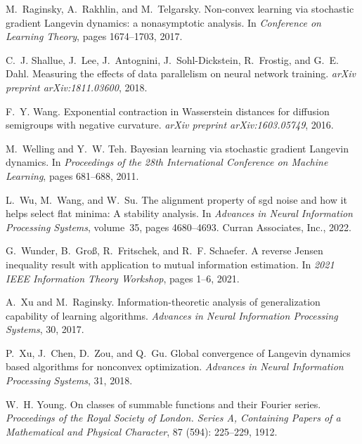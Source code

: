 \documentclass{article}
\begin{document}
\begin{thebibliography}{47}
M.~Raginsky, A.~Rakhlin, and M.~Telgarsky.
\newblock Non-convex learning via stochastic gradient {L}angevin dynamics: a nonasymptotic analysis.
\newblock In \emph{Conference on Learning Theory}, pages 1674--1703, 2017.

C.~J. Shallue, J.~Lee, J.~Antognini, J.~Sohl-Dickstein, R.~Frostig, and G.~E. Dahl.
\newblock Measuring the effects of data parallelism on neural network training.
\newblock \emph{arXiv preprint arXiv:1811.03600}, 2018.

F.~Y. Wang.
\newblock Exponential contraction in {W}asserstein distances for diffusion semigroups with negative curvature.
\newblock \emph{arXiv preprint arXiv:1603.05749}, 2016.

M.~Welling and Y.~W. Teh.
\newblock Bayesian learning via stochastic gradient {L}angevin dynamics.
\newblock In \emph{Proceedings of the 28th International Conference on Machine Learning}, pages 681--688, 2011.

L.~Wu, M.~Wang, and W.~Su.
\newblock The alignment property of sgd noise and how it helps select flat minima: A stability analysis.
\newblock In \emph{Advances in Neural Information Processing Systems}, volume~35, pages 4680--4693. Curran Associates, Inc., 2022.

G.~Wunder, B.~Gro{\ss}, R.~Fritschek, and R.~F. Schaefer.
\newblock A reverse {J}ensen inequality result with application to mutual information estimation.
\newblock In \emph{2021 IEEE Information Theory Workshop}, pages 1--6, 2021.

A.~Xu and M.~Raginsky.
\newblock Information-theoretic analysis of generalization capability of learning algorithms.
\newblock \emph{Advances in Neural Information Processing Systems}, 30, 2017.

P.~Xu, J.~Chen, D.~Zou, and Q.~Gu.
\newblock Global convergence of {L}angevin dynamics based algorithms for nonconvex optimization.
\newblock \emph{Advances in Neural Information Processing Systems}, 31, 2018.

W.~H. Young.
\newblock On classes of summable functions and their {F}ourier series.
\newblock \emph{Proceedings of the Royal Society of London. Series A, Containing Papers of a Mathematical and Physical Character}, 87 (594): 225--229, 1912.


\end{thebibliography}
\end{document}
